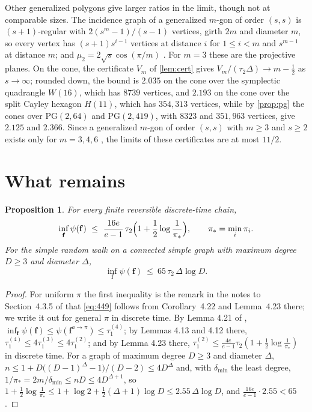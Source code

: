 \documentclass[11pt]{amsart}
\newtheorem{proposition}[theorem]{Proposition}
\theoremstyle{definition}
\newcommand{\bfF}{\mathbf{f}}
\newcommand{\PG}{\mathrm{PG}}
\begin{document}
Other generalized polygons \cite{VM} give larger ratios in the limit, though not at comparable sizes. The incidence graph of a generalized $m$-gon of order $(s,s)$ is $(s+1)$-regular with $2(s^m-1)/(s-1)$ vertices, girth $2m$ and diameter $m$, so every vertex has $(s+1)s^{i-1}$ vertices at distance $i$ for $1\le i<m$ and $s^{m-1}$ at distance $m$; and $\mu_2=2\sqrt s\cos(\pi/m)$ \cite{FH}. For $m=3$ these are the projective planes. On the cone, the certificate $V_m$ of \cref{lem:cert} gives $V_m/(\tau_2\Delta)\to m-\frac12$ as $s\to\infty$; rounded down, the bound is $2.035$ on the cone over the symplectic quadrangle $W(16)$, which has $8739$ vertices, and $2.193$ on the cone over the split Cayley hexagon $H(11)$, which has $354{,}313$ vertices, while by \cref{prop:pg} the cones over $\PG(2,64)$ and $\PG(2,419)$, with $8323$ and $351{,}963$ vertices, give $2.125$ and $2.366$. Since a generalized $m$-gon of order $(s,s)$ with $m\ge3$ and $s\ge2$ exists only for $m=3,4,6$ \cite{FH}, the limits of these certificates are at most $11/2$.

\section{What remains}\label{sec:remain}

\begin{proposition}\label{prop:degree}
For every finite reversible discrete-time chain,
\[
\inf_{\bfF}\psi(\bfF)\ \le\ \frac{16e}{e-1}\,\tau_2\Bigl(1+\frac12\log\frac1{\pi_*}\Bigr),\qquad \pi_*=\min_i\pi_i .
\]
For the simple random walk on a connected simple graph with maximum degree $D\ge3$ and diameter $\Delta$,
\[
\inf_{\bfF}\psi(\bfF)\ \le\ 65\,\tau_2\,\Delta\log D .
\]
\end{proposition}

\begin{proof}
For uniform $\pi$ the first inequality is the remark in the notes to Section~4.3.5 of \cite{AF} that \eqref{eq:449} follows from Corollary~4.22 and Lemma~4.23 there; we write it out for general $\pi$ in discrete time. By Lemma 4.21 of \cite{AF}, $\inf_{\bfF}\psi(\bfF)\le\psi(\bfF^{a\to\pi})\le\tau_1^{(4)}$; by Lemmas 4.13 and 4.12 there, $\tau_1^{(4)}\le4\tau_1^{(3)}\le4\tau_1^{(2)}$; and by Lemma 4.23 there, $\tau_1^{(2)}\le\frac{4e}{e-1}\tau_2(1+\frac12\log\frac1{\pi_*})$ in discrete time. For a graph of maximum degree $D\ge3$ and diameter $\Delta$, $n\le1+D\bigl((D-1)^\Delta-1\bigr)/(D-2)\le4D^\Delta$ and, with $\delta_{\min}$ the least degree, $1/\pi_*=2m/\delta_{\min}\le nD\le4D^{\Delta+1}$, so $1+\frac12\log\frac1{\pi_*}\le1+\log2+\frac12(\Delta+1)\log D\le2.55\,\Delta\log D$, and $\frac{16e}{e-1}\cdot2.55<65$.
\end{proof}
\end{document}
